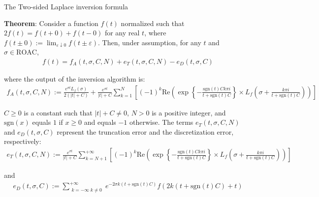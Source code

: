 \documentclass{beamer}
\begin{document}
\begin{frame}{The Two-sided Laplace inversion formula}


    {\footnotesize \scriptsize
    \par \textbf{Theorem}: Consider a function \( f(t) \) normalized such that \( 2f(t) = f(t + 0) + f(t - 0) \) 
    for any real \( t \), where \( f(t \pm 0) := \lim_{\varepsilon \downarrow 0} f(t \pm \varepsilon) \). 
    Then, under assumption, for any \( t \) and \( \sigma \in \text{ROAC} \),
    \begin{align*}
        f(t) = f_A(t, \sigma, C, N) + e_T(t, \sigma, C, N) - e_D(t, \sigma, C)
    \end{align*}
    \par where the output of the inversion algorithm is:
    {\footnotesize \tiny
    \begin{align*}
        f_A(t, \sigma, C, N) := \frac{e^{\sigma t} L_f(\sigma)}{2(|t| + C)} + \frac{e^{\sigma t}}{|t| + C} 
        \sum_{k=1}^{N} \left[ (-1)^k \text{Re} \left( \exp \left\{ -\frac{\text{sgn}(t)C k \pi i}{t 
        + \text{sgn}(t)C} \right\} \times L_f \left( \sigma + \frac{k \pi i}{t + \text{sgn}(t)C} \right) \right) \right]
    \end{align*}
    }
    \par \( C \geq 0 \) is a constant such that \( |t| + C \neq 0 \), \( N > 0 \) is a positive integer, and \(\text{sgn}(x)\) equals \( 1 \) if \( x \geq 0 \) and equals \(-1\) otherwise.
     The terms \( e_T(t, \sigma, C, N) \) and \( e_D(t, \sigma, C) \) represent the truncation error and the discretization error, respectively:
     {\footnotesize \tiny
    \begin{align*}
       e_T(t, \sigma, C, N) := \frac{e^{\sigma t}}{|t| + C} 
       \sum_{k=N+1}^{+\infty} \left[ (-1)^k \text{Re} \left( \exp \left\{ -\frac{\text{sgn}(t)C k \pi i}{t + \text{sgn}(t)C} \right\} 
       \times L_f \left( \sigma + \frac{k \pi i}{t + \text{sgn}(t)C} \right) \right) \right]    
    \end{align*}
    }
    \par and 
     {\footnotesize \tiny
    \begin{align*}
      e_D(t, \sigma, C) := \sum_{\substack{k=-\infty \; k \neq 0}}^{+\infty} e^{-2\sigma k (t + \text{sgn}(t)C)} f(2k(t + \text{sgn}(t)C) + t)
    \end{align*}
    }
    }
    
\end{frame}
\end{document}
